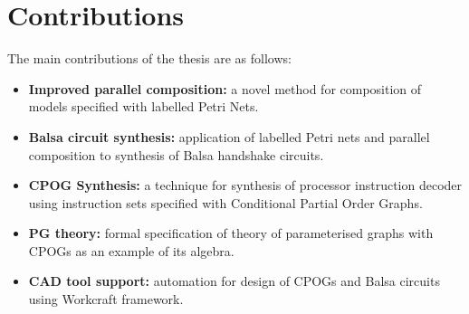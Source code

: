 %
%
%
%
%
%
%
%

\section{Contributions}

The main contributions of the thesis are as follows:

\begin{itemize}
\item
\textbf{Improved parallel composition:} a novel method for composition of models specified with labelled Petri Nets.

\item
\textbf{Balsa circuit synthesis:} application of labelled Petri nets and parallel composition to synthesis of Balsa handshake circuits.

\item
\textbf{CPOG Synthesis:} a technique for synthesis of processor instruction decoder using instruction sets specified with Conditional Partial Order Graphs.

\item
\textbf{PG theory:} formal specification of theory of parameterised graphs with CPOGs as an example of its algebra.

\item
\textbf{CAD tool support:} automation for design of CPOGs and Balsa circuits using Workcraft framework.

\end{itemize}

